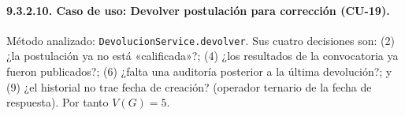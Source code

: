 \endgroup
\addtocounter{table}{-1}
\vspace{-0.5\baselineskip}

\paragraph{9.3.2.10. Caso de uso: Devolver postulación para corrección (CU-19).}

Método analizado: \texttt{DevolucionService.devolver}. Sus cuatro decisiones son: (2) ¿la postulación ya no está «calificada»?; (4) ¿los resultados de la convocatoria ya fueron publicados?; (6) ¿falta una auditoría posterior a la última devolución?; y (9) ¿el historial no trae fecha de creación? (operador ternario de la fecha de respuesta). Por tanto $V(G)=5$.

